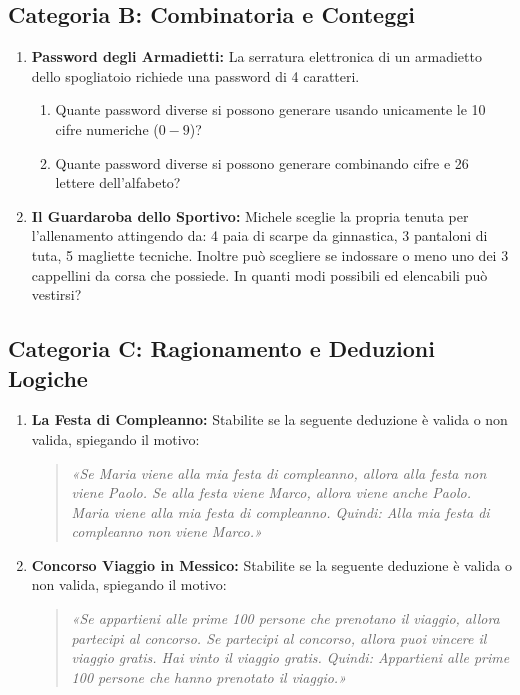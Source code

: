 \documentclass[11pt, a4paper]{article}
\begin{document}
\subsection*{Categoria B: Combinatoria e Conteggi}
\begin{enumerate}[resume]
    \item \textbf{Password degli Armadietti:} La serratura elettronica di un armadietto dello spogliatoio richiede una password di 4 caratteri.
    \begin{enumerate}
        \item Quante password diverse si possono generare usando unicamente le 10 cifre numeriche ($0-9$)?
        \item Quante password diverse si possono generare combinando cifre e 26 lettere dell'alfabeto?
    \end{enumerate}
    
    \vspace{1cm}

    \item \textbf{Il Guardaroba dello Sportivo:} Michele sceglie la propria tenuta per l'allenamento attingendo da: 4 paia di scarpe da ginnastica, 3 pantaloni di tuta, 5 magliette tecniche. Inoltre può scegliere se indossare o meno uno dei 3 cappellini da corsa che possiede. In quanti modi possibili ed elencabili può vestirsi?
    
    \vspace{1cm}
\end{enumerate}

\subsection*{Categoria C: Ragionamento e Deduzioni Logiche}
\begin{enumerate}[resume]
    \item \textbf{La Festa di Compleanno:} Stabilite se la seguente deduzione è valida o non valida, spiegando il motivo:
    \begin{quote}
    \textit{«Se Maria viene alla mia festa di compleanno, allora alla festa non viene Paolo. Se alla festa viene Marco, allora viene anche Paolo. Maria viene alla mia festa di compleanno. Quindi: Alla mia festa di compleanno non viene Marco.»}
    \end{quote}
    
    \vspace{1cm}

    \item \textbf{Concorso Viaggio in Messico:} Stabilite se la seguente deduzione è valida o non valida, spiegando il motivo:
    \begin{quote}
    \textit{«Se appartieni alle prime 100 persone che prenotano il viaggio, allora partecipi al concorso. Se partecipi al concorso, allora puoi vincere il viaggio gratis. Hai vinto il viaggio gratis. Quindi: Appartieni alle prime 100 persone che hanno prenotato il viaggio.»}
    \end{quote}
    
    \vspace{1cm}
\end{enumerate}
\end{document}
